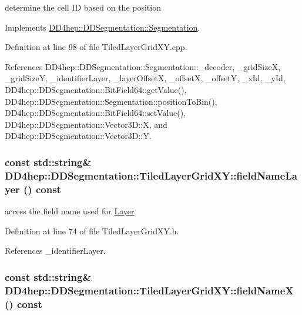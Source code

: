 determine the cell ID based on the position 

Implements \hyperlink{class_d_d4hep_1_1_d_d_segmentation_1_1_segmentation_ad5a60953d96d409850d8192f64f8ce3c}{DD4hep::DDSegmentation::Segmentation}.

Definition at line 98 of file TiledLayerGridXY.cpp.

References DD4hep::DDSegmentation::Segmentation::\_\-decoder, \_\-gridSizeX, \_\-gridSizeY, \_\-identifierLayer, \_\-layerOffsetX, \_\-offsetX, \_\-offsetY, \_\-xId, \_\-yId, DD4hep::DDSegmentation::BitField64::getValue(), DD4hep::DDSegmentation::Segmentation::positionToBin(), DD4hep::DDSegmentation::BitField64::setValue(), DD4hep::DDSegmentation::Vector3D::X, and DD4hep::DDSegmentation::Vector3D::Y.\hypertarget{class_d_d4hep_1_1_d_d_segmentation_1_1_tiled_layer_grid_x_y_a8a21faf4be7569e667a271846705f9f9}{
\subsubsection[{fieldNameLayer}]{\setlength{\rightskip}{0pt plus 5cm}const std::string\& DD4hep::DDSegmentation::TiledLayerGridXY::fieldNameLayer () const}}
\label{class_d_d4hep_1_1_d_d_segmentation_1_1_tiled_layer_grid_x_y_a8a21faf4be7569e667a271846705f9f9}


access the field name used for \hyperlink{class_d_d4hep_1_1_layer}{Layer} 

Definition at line 74 of file TiledLayerGridXY.h.

References \_\-identifierLayer.\hypertarget{class_d_d4hep_1_1_d_d_segmentation_1_1_tiled_layer_grid_x_y_a68e8c0f2eda5eeec041759b2c688272f}{
\subsubsection[{fieldNameX}]{\setlength{\rightskip}{0pt plus 5cm}const std::string\& DD4hep::DDSegmentation::TiledLayerGridXY::fieldNameX () const}}
\label{class_d_d4hep_1_1_d_d_segmentation_1_1_tiled_layer_grid_x_y_a68e8c0f2eda5eeec041759b2c688272f}


